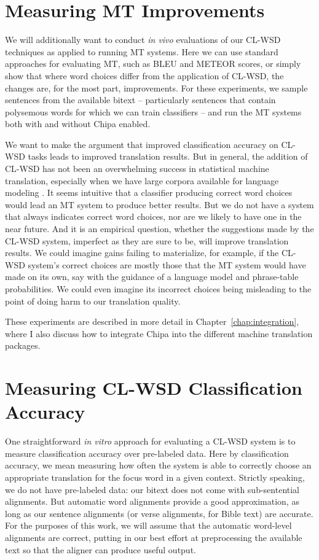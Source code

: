 \section{Measuring MT Improvements}
We will additionally want to conduct \emph{in vivo} evaluations of our CL-WSD
techniques as applied to running MT systems. Here we can use standard
approaches for evaluating MT, such as BLEU and METEOR scores, or simply show
that where word choices differ from the application of CL-WSD, the changes are,
for the most part, improvements. For these experiments, we sample sentences
from the available bitext -- particularly sentences that contain polysemous
words for which we can train classifiers -- and run the MT systems both with
and without Chipa enabled.

We want to make the argument that improved classification accuracy on CL-WSD
tasks leads to improved translation results.
But in general, the addition of CL-WSD has not been an overwhelming success in
statistical machine translation, especially when we have large corpora
available for language modeling \cite{carpuatpsd}.
It seems intuitive that a
classifier producing correct word choices would lead an MT system to produce
better results. But we do not have a system that always indicates correct word
choices, nor are we likely to have one in the near future. And it is an
empirical question, whether the suggestions made by the CL-WSD system,
imperfect as they are sure to be, will improve translation results. We could
imagine gains failing to materialize, for example, if the CL-WSD system's
correct choices are mostly those that the MT system would have made on its own,
say with the guidance of a language model and phrase-table probabilities. 
We could even imagine its incorrect choices being misleading to the point of
doing harm to our translation quality.

These experiments are described in more detail in
Chapter~\ref{chap:integration}, where I also discuss how to integrate Chipa
into the different machine translation packages.

\section{Measuring CL-WSD Classification Accuracy}
One straightforward \emph{in vitro} approach for evaluating a CL-WSD system is
to measure classification accuracy over pre-labeled data. Here by
classification accuracy, we mean measuring how often the system is able to
correctly choose an appropriate translation for the focus word in a given
context.
Strictly speaking, we
do not have pre-labeled data: our bitext does not come with sub-sentential
alignments. But automatic word alignments provide a good approximation, as long
as our sentence alignments (or verse alignments, for Bible text) are accurate.
For the purposes of this work, we will assume that the automatic word-level
alignments are correct, putting in our best effort at preprocessing the
available text so that the aligner can produce useful output.

